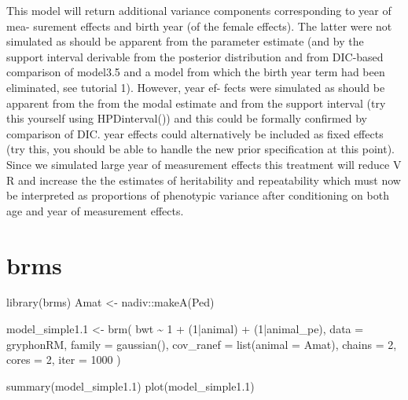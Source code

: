 \documentclass[
  12pt,
]{book}
\newenvironment{Shaded}{\begin{snugshade}}{\end{snugshade}}
\newcommand{\AttributeTok}[1]{\textcolor[rgb]{0.77,0.63,0.00}{#1}}
\newcommand{\DecValTok}[1]{\textcolor[rgb]{0.00,0.00,0.81}{#1}}
\newcommand{\FloatTok}[1]{\textcolor[rgb]{0.00,0.00,0.81}{#1}}
\newcommand{\FunctionTok}[1]{\textcolor[rgb]{0.00,0.00,0.00}{#1}}
\newcommand{\NormalTok}[1]{#1}
\newcommand{\OtherTok}[1]{\textcolor[rgb]{0.56,0.35,0.01}{#1}}
\newcommand{\SpecialCharTok}[1]{\textcolor[rgb]{0.00,0.00,0.00}{#1}}
\begin{document}
This model will return additional variance components corresponding to year of mea- surement effects and birth year (of the female effects). The latter were not simulated as should be apparent from the parameter estimate (and by the support interval derivable from the posterior distribution and from DIC-based comparison of model3.5 and a model from which the birth year term had been eliminated, see tutorial 1). However, year ef- fects were simulated as should be apparent from the from the modal estimate and from the support interval (try this yourself using HPDinterval()) and this could be formally confirmed by comparison of DIC. year effects could alternatively be included as fixed effects (try this, you should be able to handle the new prior specification at this point). Since we simulated large year of measurement effects this treatment will reduce V R and increase the the estimates of heritability and repeatability which must now be interpreted as proportions of phenotypic variance after conditioning on both age and year of measurement effects.

\hypertarget{brms-3}{%
\section{brms}\label{brms-3}}

\begin{Shaded}
\begin{Highlighting}[]
\FunctionTok{library}\NormalTok{(brms)}
\NormalTok{Amat }\OtherTok{\textless{}{-}}\NormalTok{ nadiv}\SpecialCharTok{::}\FunctionTok{makeA}\NormalTok{(Ped)}

\NormalTok{model\_simple1}\FloatTok{.1} \OtherTok{\textless{}{-}} \FunctionTok{brm}\NormalTok{(}
\NormalTok{  bwt }\SpecialCharTok{\textasciitilde{}} \DecValTok{1} \SpecialCharTok{+}\NormalTok{ (}\DecValTok{1}\SpecialCharTok{|}\NormalTok{animal) }\SpecialCharTok{+}\NormalTok{ (}\DecValTok{1}\SpecialCharTok{|}\NormalTok{animal\_pe), }\AttributeTok{data =}\NormalTok{ gryphonRM,}
  \AttributeTok{family =} \FunctionTok{gaussian}\NormalTok{(), }\AttributeTok{cov\_ranef =} \FunctionTok{list}\NormalTok{(}\AttributeTok{animal =}\NormalTok{ Amat),}
  \AttributeTok{chains =} \DecValTok{2}\NormalTok{, }\AttributeTok{cores =} \DecValTok{2}\NormalTok{, }\AttributeTok{iter =} \DecValTok{1000}
\NormalTok{)}

\FunctionTok{summary}\NormalTok{(model\_simple1}\FloatTok{.1}\NormalTok{)}
\FunctionTok{plot}\NormalTok{(model\_simple1}\FloatTok{.1}\NormalTok{)}
\end{Highlighting}
\end{Shaded}
\end{document}
